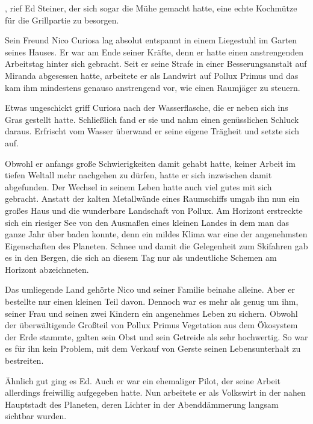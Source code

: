 , rief Ed Steiner, der sich sogar die Mühe gemacht hatte, eine echte Kochmütze für die Grillpartie zu besorgen.

\par

Sein Freund Nico Curiosa lag absolut entspannt in einem Liegestuhl im Garten seines Hauses. Er war am Ende seiner Kräfte, denn er hatte einen anstrengenden Arbeitstag hinter sich gebracht. Seit er seine Strafe in einer Besserungsanstalt auf Miranda abgesessen hatte, arbeitete er als Landwirt auf Pollux Primus und das kam ihm mindestens genauso anstrengend vor, wie einen Raumjäger zu steuern.

\par

Etwas ungeschickt griff Curiosa nach der Wasserflasche, die er neben sich ins Gras gestellt hatte. Schließlich fand er sie und nahm einen genüsslichen Schluck daraus. Erfrischt vom Wasser überwand er seine eigene Trägheit und setzte sich auf.

\par

Obwohl er anfangs große Schwierigkeiten damit gehabt hatte, keiner Arbeit im tiefen Weltall mehr nachgehen zu dürfen, hatte er sich inzwischen damit abgefunden. Der Wechsel in seinem Leben hatte auch viel gutes mit sich gebracht. Anstatt der kalten Metallwände eines Raumschiffs umgab ihn nun ein großes Haus und die wunderbare Landschaft von Pollux. Am Horizont erstreckte sich ein riesiger See von den Ausmaßen eines kleinen Landes in dem man das ganze Jahr über baden konnte, denn ein mildes Klima war eine der angenehmsten Eigenschaften des Planeten. Schnee und damit die Gelegenheit zum Skifahren gab es in den Bergen, die sich an diesem Tag nur als undeutliche Schemen am Horizont abzeichneten.

\par

Das umliegende Land gehörte Nico und seiner Familie beinahe alleine. Aber er bestellte nur einen kleinen Teil davon. Dennoch war es mehr als genug um ihm, seiner Frau und seinen zwei Kindern ein angenehmes Leben zu sichern. Obwohl der überwältigende Großteil von Pollux Primus Vegetation aus dem Ökosystem der Erde stammte, galten sein Obst und sein Getreide als sehr hochwertig. So war es für ihn kein Problem, mit dem Verkauf von Gerste seinen Lebensunterhalt zu bestreiten.

\par

Ähnlich gut ging es Ed. Auch er war ein ehemaliger Pilot, der seine Arbeit allerdings freiwillig aufgegeben hatte. Nun arbeitete er als Volkswirt in der nahen Hauptstadt des Planeten, deren Lichter in der Abenddämmerung langsam sichtbar wurden.

